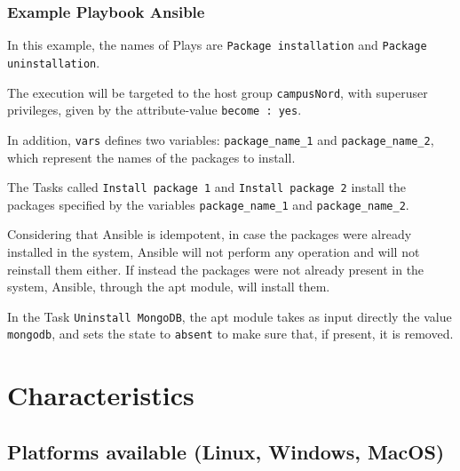 \documentclass[12pt,a4paper,openright,twoside]{book}
\begin{document}
\subsubsection{Example Playbook Ansible}



In this example, the names of Plays are \texttt{Package installation} and \texttt{Package uninstallation}.

The execution will be targeted to the host group \texttt{campusNord}, with superuser privileges, given by the attribute-value \texttt{become : yes}.

In addition, \texttt{vars} defines two variables: \texttt{package\_name\_1} and \texttt{package\_name\_2}, which represent the names of the packages to install.

The Tasks called \texttt{Install package 1} and \texttt{Install package 2} install the packages specified by the variables \texttt{package\_name\_1} and \texttt{package\_name\_2}.

Considering that Ansible is idempotent,
in case the packages were already installed in the system, Ansible will not perform any operation and will not reinstall them either. If instead the packages were not already present in the system, Ansible, through the apt module, will install them.

In the Task \texttt{Uninstall MongoDB}, the apt module takes as input directly the value \texttt{mongodb}, and sets the state to \texttt{absent} to make sure that, if present, it is removed.




\section{Characteristics}

\subsection{Platforms available (Linux, Windows, MacOS)}
\end{document}
